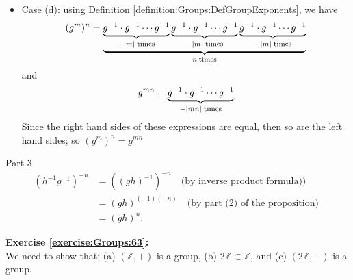 \begin{itemize}
\item
Case (d): using Definition \ref{definition:Groups:DefGroupExponents}, we have\\
\[
(g^m)^n = \underbrace{ \underbrace{g^{-1} \cdot g^{-1} \cdots g^{-1}}_{-|m| \; {\rm times}}\underbrace{g^{-1} \cdot g^{-1} \cdots g^{-1}}_{-|m| \; {\rm times}}\underbrace{g^{-1} \cdot g^{-1} \cdots g^{-1}}_{-|m| \; {\rm times}}}_{n \: {\rm times}}
\]
and
\[
g^{m  n} = {\underbrace{g^{-1} \cdot g^{-1}  \cdots g^{-1}}_{-|mn| \; {\rm times}}}
\]
Since the right hand sides of these expressions are equal, then so are the left hand sides; so $(g^m)^n = g^{m  n}$\\
\end{itemize}


Part 3\\
\begin{align*}
(h^{-1}g^{-1})^{-n}&= ((gh)^{-1})^{-n} \quad \text{(by inverse product formula))}\\
&=(gh)^{(-1)(-n)} \quad \text{(by part (2) of the proposition) }\\
&=(gh)^n.
\end{align*}

\noindent\textbf{Exercise \ref{exercise:Groups:63}:}\\
We need to show that: (a) $({\mathbb Z}, +)$ is a group, (b) $2{\mathbb Z} \subset {\mathbb Z}$, and (c) $(2{\mathbb Z}, +)$ is a group.

